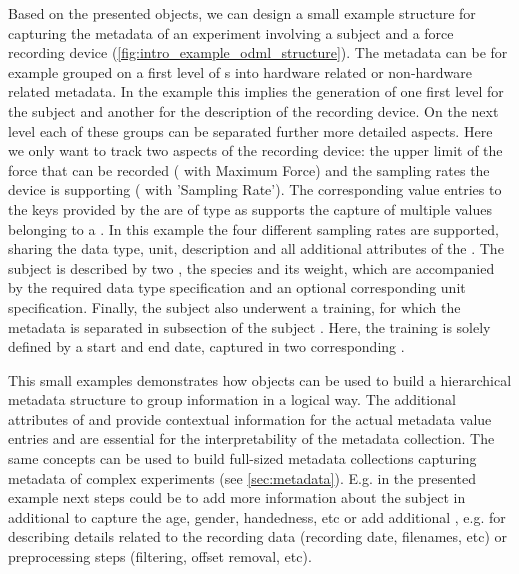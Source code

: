 Based on the presented  objects, we can design a small example structure for capturing the metadata of an experiment involving a subject and a force recording device (\cref{fig:intro_example_odml_structure}). The metadata can be for example grouped on a first level of s into hardware related or non-hardware related metadata. In the example this implies the generation of one first level  for the subject and another  for the description of the recording device. On the next level each of these groups can be separated further more detailed aspects. Here we only want to track two aspects of the recording device: the upper limit of the force that can be recorded ( with  Maximum Force) and the sampling rates the device is supporting ( with  'Sampling Rate'). The corresponding value entries to the keys provided by the  are of type  as  supports the capture of multiple values belonging to a . In this example the four different sampling rates are supported, sharing the data type, unit, description and all additional attributes of the . The subject is described by two , the species and its weight, which are accompanied by the required data type specification and an optional corresponding unit specification. Finally, the subject also underwent a training, for which the metadata is separated in subsection of the subject . Here, the training is solely defined by a start and end date, captured in two corresponding .

This small examples demonstrates how  objects can be used to build a hierarchical metadata structure to group information in a logical way. The additional attributes of  and  provide contextual information for the actual metadata value entries and are essential for the interpretability of the metadata collection. The same concepts can be used to build full-sized metadata collections capturing metadata of complex experiments (see \cref{sec:metadata}). E.g. in the presented example next steps could be to add more information about the subject in additional  to capture the age, gender, handedness, etc or add additional , e.g. for describing details related to the recording data (recording date, filenames, etc) or preprocessing steps (filtering, offset removal, etc).

